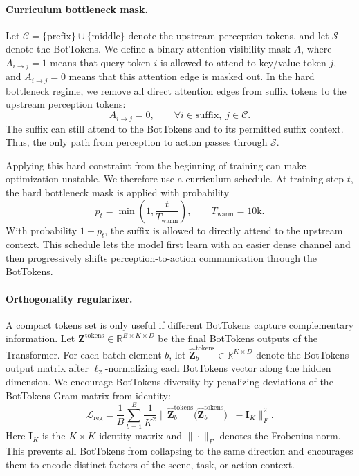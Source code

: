 \documentclass[a4paper,table]{extarticle}
\begin{document}
\paragraph{Curriculum bottleneck mask.}
Let $\mathcal C = \{\text{prefix}\}\cup\{\text{middle}\}$ denote the upstream perception tokens, and let $\mathcal S$ denote the BotTokens. We define a binary attention-visibility mask $A$, where $A_{i\to j}=1$ means that query token $i$ is allowed to attend to key/value token $j$, and $A_{i\to j}=0$ means that this attention edge is masked out. In the hard bottleneck regime, we remove all direct attention edges from suffix tokens to the upstream perception tokens:
\begin{equation}
A_{i\to j} = 0,
\qquad
\forall i\in\text{suffix},\; j\in\mathcal C.
\end{equation}
The suffix can still attend to the BotTokens and to its permitted suffix context. Thus, the only path from perception to action passes through $\mathcal S$.

Applying this hard constraint from the beginning of training can make optimization unstable. We therefore use a curriculum schedule. At training step $t$, the hard bottleneck mask is applied with probability
\begin{equation}
p_t = \min\left(1,\frac{t}{T_{\mathrm{warm}}}\right),
\qquad T_{\mathrm{warm}}=10\mathrm{k}.
\end{equation}
With probability $1-p_t$, the suffix is allowed to directly attend to the upstream context. This schedule lets the model first learn with an easier dense channel and then progressively shifts perception-to-action communication through the BotTokens.

\paragraph{Orthogonality regularizer.}
A compact tokens set is only useful if different BotTokens capture complementary information. Let $\mathbf Z^{\mathrm{tokens}} \in \mathbb{R}^{B\times K\times D}$ be the final BotTokens outputs of the Transformer. For each batch element $b$, let $\hat{\mathbf Z}^{\mathrm{tokens}}_b\in\mathbb R^{K\times D}$ denote the BotTokens-output matrix after $\ell_2$-normalizing each BotTokens vector along the hidden dimension. We encourage BotTokens diversity by penalizing deviations of the BotTokens Gram matrix from identity:
\begin{equation}
  \mathcal{L}_{\mathrm{reg}}
  =
  \frac{1}{B}\sum_{b=1}^{B}
  \frac{1}{K^2}
  \big\lVert
  \hat{\mathbf Z}^{\mathrm{tokens}}_b
  \big(\hat{\mathbf Z}^{\mathrm{tokens}}_b\big)^\top
  - \mathbf I_K
  \big\rVert_F^2 .
\end{equation}
Here $\mathbf I_K$ is the $K\times K$ identity matrix and $\|\cdot\|_F$ denotes the Frobenius norm. This prevents all BotTokens from collapsing to the same direction and encourages them to encode distinct factors of the scene, task, or action context.
\end{document}
